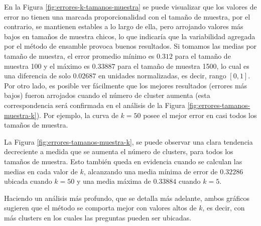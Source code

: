 \bigskip En la Figura \ref{fig:errores-k-tamanos-muestra} se puede visualizar que los valores de error no tienen una marcada proporcionalidad con el tamaño de muestra, por el contrario, se mantienen estables a lo largo de ella, pero arrojando valores más bajos en tamaños de muestra chicos, lo que indicaría que la variabilidad agregada por el método de ensamble provoca buenos resultados. Si tomamos las medias por tamaño de muestra, el error promedio mínimo es \(0.312\) para el tamaño de muestra 100 y el máximo es \(0.33887\) para el tamaño de muestra 1500, lo cual es una diferencia de solo \(0.02687\) en unidades normalizadas, es decir, rango \([0, 1]\). Por otro lado, es posible ver fácilmente que los mejores resultados (errores más bajos) fueron arrojados cuando el número de cluster aumenta (esta correspondencia será confirmada en el análisis de la Figura \ref{fig:errores-tamanos-muestra-k}). Por ejemplo, la curva de \(k = 50\) posee el mejor error en casi todos los tamaños de muestra.

\bigskip La Figura \ref{fig:errores-tamanos-muestra-k}, se puede observar una clara tendencia decreciente a medida que se aumenta el número de clusters, para todos los tamaños de muestra. Esto también queda en evidencia cuando se calculan las medias en cada valor de \(k\), alcanzando una media mínima de error de \(0.32286\) ubicada cuando \(k = 50\) y una media máxima de \(0.33884\) cuando \(k = 5\).

\bigskip Haciendo un análisis más profundo, que se detalla más adelante, ambos gráficos sugieren que el método se comporta mejor con valores altos de \(k\), es decir, con más clusters en los cuales las preguntas pueden ser ubicadas.